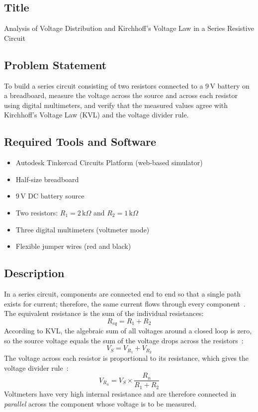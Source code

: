 \documentclass[11pt,a4paper]{article}
\begin{document}
\subsection{Title}
Analysis of Voltage Distribution and Kirchhoff's Voltage Law in a Series Resistive Circuit

\subsection{Problem Statement}
To build a series circuit consisting of two resistors connected to a 9\,V battery on a breadboard, measure the voltage across the source and across each resistor using digital multimeters, and verify that the measured values agree with Kirchhoff's Voltage Law (KVL) and the voltage divider rule.

\subsection{Required Tools and Software}
\begin{itemize}
    \item Autodesk Tinkercad Circuits Platform (web-based simulator)~\cite{ref_tinkercad}
    \item Half-size breadboard
    \item 9\,V DC battery source
    \item Two resistors: $R_1 = 2\,\text{k}\Omega$ and $R_2 = 1\,\text{k}\Omega$
    \item Three digital multimeters (voltmeter mode)
    \item Flexible jumper wires (red and black)
\end{itemize}

\subsection{Description}
In a series circuit, components are connected end to end so that a single path exists for current; therefore, the same current flows through every component~\cite{ref_boylestad}. The equivalent resistance is the sum of the individual resistances:
\[
R_{eq} = R_1 + R_2
\]
According to KVL, the algebraic sum of all voltages around a closed loop is zero, so the source voltage equals the sum of the voltage drops across the resistors~\cite{ref_boylestad}:
\[
V_S = V_{R_1} + V_{R_2}
\]
The voltage across each resistor is proportional to its resistance, which gives the voltage divider rule~\cite{ref_floyd}:
\[
V_{R_n} = V_S \times \frac{R_n}{R_1 + R_2}
\]
Voltmeters have very high internal resistance and are therefore connected in \emph{parallel} across the component whose voltage is to be measured.
\end{document}
